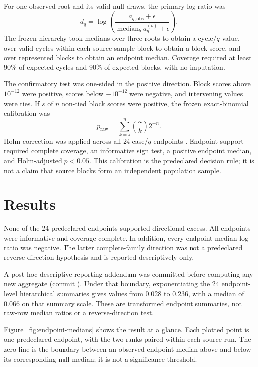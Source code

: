\documentclass[11pt]{article}
\newcommand{\code}[1]{\texttt{\detokenize{#1}}}
\begin{document}
For one observed root and its valid null draws, the primary log-ratio was
\[
d_q=\log\left(
\frac{a_{q,\mathrm{obs}}+\epsilon}
{\operatorname{median}_b a_q^{(b)}+\epsilon}
\right).
\]
The frozen hierarchy took medians over three roots to obtain a cycle/\(q\)
value, over valid cycles within each source-sample block to obtain a block
score, and over represented blocks to obtain an endpoint median. Coverage
required at least 90\% of expected cycles and 90\% of expected blocks, with no
imputation.

The confirmatory test was one-sided in the positive direction. Block scores
above \(10^{-12}\) were positive, scores below \(-10^{-12}\) were negative,
and intervening values were ties. If \(s\) of \(n\) non-tied block scores were
positive, the frozen exact-binomial calibration was
\[
p_{\mathrm{raw}}=\sum_{k=s}^{n}\binom{n}{k}2^{-n}.
\]
Holm correction was applied across all 24 case/\(q\) endpoints
\cite{holm1979simple}. Endpoint support required complete coverage, an
informative sign test, a positive endpoint median, and Holm-adjusted
\(p<0.05\). This calibration is the predeclared decision rule; it is not a
claim that source blocks form an independent population sample.

\section{Results}
\label{sec:results}

None of the 24 predeclared endpoints supported directional excess. All
endpoints were informative and coverage-complete. In addition, every endpoint
median log-ratio was negative. The latter complete-family direction was not a
predeclared reverse-direction hypothesis and is reported descriptively only.

A post-hoc descriptive reporting addendum was committed before computing any
new aggregate (commit \code{671e6d1}). Under that boundary, exponentiating the
24 endpoint-level hierarchical summaries gives values from 0.028 to 0.236,
with a median of 0.066 on that summary scale. These are transformed endpoint
summaries, not raw-row median ratios or a reverse-direction test.

Figure~\ref{fig:endpoint-medians} shows the result at a glance. Each plotted
point is one predeclared endpoint, with the two ranks paired within each source
run. The zero line is the boundary between an observed endpoint median above
and below its corresponding null median; it is not a significance threshold.
\end{document}
